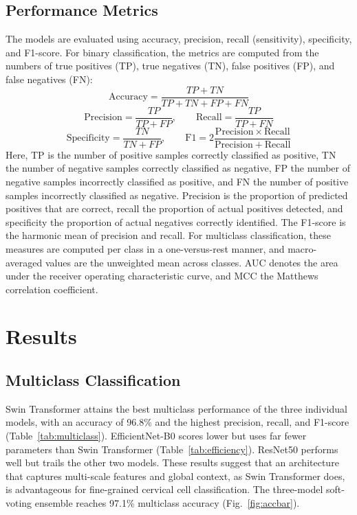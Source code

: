 \documentclass[conference]{IEEEtran}
\begin{document}
\subsection{Performance Metrics}
The models are evaluated using accuracy, precision, recall (sensitivity), specificity, and F1-score. For binary classification, the metrics are computed from the numbers of true positives (TP), true negatives (TN), false positives (FP), and false negatives (FN):
\begin{equation}
    \mathrm{Accuracy}=\frac{TP+TN}{TP+TN+FP+FN}
    \label{eq:accuracy}
\end{equation}
\begin{equation}
    \mathrm{Precision}=\frac{TP}{TP+FP},\qquad
    \mathrm{Recall}=\frac{TP}{TP+FN}
    \label{eq:precision_recall}
\end{equation}
\begin{equation}
    \mathrm{Specificity}=\frac{TN}{TN+FP},\qquad
    \mathrm{F1}=2\frac{\mathrm{Precision}\times\mathrm{Recall}}
    {\mathrm{Precision}+\mathrm{Recall}}
    \label{eq:specificity_f1}
\end{equation}
Here, TP is the number of positive samples correctly classified as positive, TN the number of negative samples correctly classified as negative, FP the number of negative samples incorrectly classified as positive, and FN the number of positive samples incorrectly classified as negative. Precision is the proportion of predicted positives that are correct, recall the proportion of actual positives detected, and specificity the proportion of actual negatives correctly identified. The F1-score is the harmonic mean of precision and recall. For multiclass classification, these measures are computed per class in a one-versus-rest manner, and macro-averaged values are the unweighted mean across classes. AUC denotes the area under the receiver operating characteristic curve, and MCC the Matthews correlation coefficient.

\section{Results}
\label{sec:results}

\subsection{Multiclass Classification}

Swin Transformer attains the best multiclass performance of the three individual models, with an accuracy of 96.8\% and the highest precision, recall, and F1-score (Table~\ref{tab:multiclass}). EfficientNet-B0 scores lower but uses far fewer parameters than Swin Transformer (Table~\ref{tab:efficiency}). ResNet50 performs well but trails the other two models. These results suggest that an architecture that captures multi-scale features and global context, as Swin Transformer does, is advantageous for fine-grained cervical cell classification. The three-model soft-voting ensemble reaches 97.1\% multiclass accuracy (Fig.~\ref{fig:accbar}).
\end{document}
